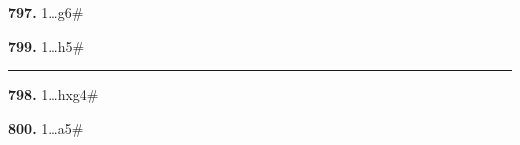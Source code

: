\documentclass[12pt,twoside]{article}
\begin{document}
{\footnotesize\sloppy
\noindent
\begin{minipage}[t]{\textwidth}
    \begin{minipage}[c]{0.47\textwidth}
{\bfseries 797.} 1\ldots g6\#
        \vspace{0.45em}

{\bfseries 799.} 1\ldots h5\#    \end{minipage}
        \hfill
    \begin{minipage}[c][4.9\baselineskip][c]{0.02\textwidth}
        \centering\rule{0.4pt}{4.7\baselineskip}
    \end{minipage}
    \hfill
    \begin{minipage}[c]{0.47\textwidth}
{\bfseries 798.} 1\ldots hxg4\#
        \vspace{0.45em}

{\bfseries 800.} 1\ldots a5\#    \end{minipage}
\end{minipage}
}
\end{document}
